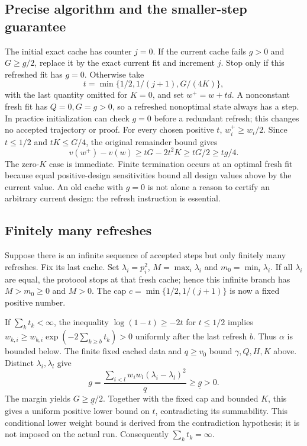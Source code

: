 \documentclass[11pt]{article}
\begin{document}
\subsection{Precise algorithm and the smaller-step guarantee}
The initial exact cache has counter $j=0$. If the current cache fails $g>0$ and $G\ge g/2$, replace it by the exact current fit and increment $j$. Stop only if this refreshed fit has $g=0$. Otherwise take
\[
 t=\min\{1/2,1/(j+1),G/(4K)\},
\]
with the last quantity omitted for $K=0$, and set $w^+=w+td$. A nonconstant fresh fit has $Q=0,G=g>0$, so a refreshed nonoptimal state always has a step. In practice initialization can check $g=0$ before a redundant refresh; this changes no accepted trajectory or proof.
For every chosen positive $t$, $w_i^+\ge w_i/2$. Since $t\le1/2$ and $tK\le G/4$, the original remainder bound gives
\begin{equation}\label{eq:smallerstep}
 v(w^+)-v(w)\ge tG-2t^2K\ge tG/2\ge tg/4.
\end{equation}
The zero-$K$ case is immediate. Finite termination occurs at an optimal fresh fit because equal positive-design sensitivities bound all design values above by the current value. An old cache with $g=0$ is not alone a reason to certify an arbitrary current design: the refresh instruction is essential.

\subsection{Finitely many refreshes}
Suppose there is an infinite sequence of accepted steps but only finitely many refreshes. Fix its last cache. Set $\lambda_i=p_i^2$, $M=\max_i\lambda_i$ and $m_0=\min_i\lambda_i$. If all $\lambda_i$ are equal, the protocol stops at that fresh cache; hence this infinite branch has $M>m_0\ge0$ and $M>0$.
The cap $c=\min\{1/2,1/(j+1)\}$ is now a fixed positive number.

If $\sum_k t_k<\infty$, the inequality $\log(1-t)\ge-2t$ for $t\le1/2$ implies
$w_{k,i}\ge w_{b,i}\exp(-2\sum_{k\ge b}t_k)>0$ uniformly after the last refresh $b$. Thus $\alpha$ is bounded below. The finite fixed cached data and $q\ge v_0$ bound $\gamma,Q,H,K$ above. Distinct $\lambda_i,\lambda_l$ give
\[
 g=\frac{\sum_{i<l}w_iw_l(\lambda_i-\lambda_l)^2}{q}\ge\underline g>0.
\]
The margin yields $G\ge\underline g/2$. Together with the fixed cap and bounded $K$, this gives a uniform positive lower bound on $t$, contradicting its summability. This conditional lower weight bound is derived from the contradiction hypothesis; it is not imposed on the actual run. Consequently $\sum_k t_k=\infty$.
\end{document}
